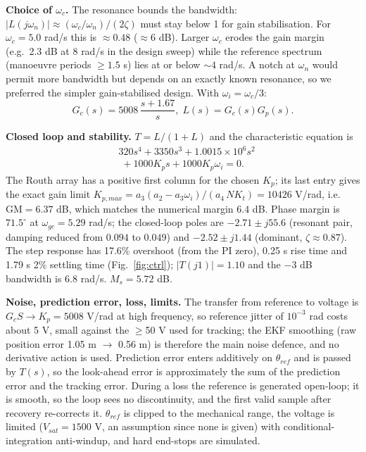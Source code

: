 \documentclass[conference]{IEEEtran}
\newcommand{\dg}{^\circ}
\begin{document}
\textbf{Choice of $\omega_c$.} The resonance bounds the bandwidth: $|L(j\omega_n)|\approx(\omega_c/\omega_n)/(2\zeta)$ must stay below 1 for gain stabilisation. For $\omega_c=5.0$ rad/s this is $\approx0.48$ ($\approx6$ dB). Larger $\omega_c$ erodes the gain margin (e.g.\ 2.3 dB at 8 rad/s in the design sweep) while the reference spectrum (manoeuvre periods $\ge1.5$ s) lies at or below $\sim4$ rad/s. A notch at $\omega_n$ would permit more bandwidth but depends on an exactly known resonance, so we preferred the simpler gain-stabilised design. With $\omega_i=\omega_c/3$:
\begin{equation}
G_c(s)=5008\,\frac{s+1.67}{s},\; L(s)=G_c(s)G_p(s).
\end{equation}

\textbf{Closed loop and stability.} $T=L/(1+L)$ and the characteristic equation is
\begin{equation}
\begin{split}&320s^4+3350s^3+1.0015{\times}10^6s^2\\&\;+1000K_ps+1000K_p\omega_i=0.\end{split}
\end{equation}
The Routh array has a positive first column for the chosen $K_p$; its last entry gives the exact gain limit $K_{p,max}=a_3(a_2-a_3\omega_i)/(a_4\,NK_t)=10426$ V/rad, i.e.\ $\mathrm{GM}=6.37$ dB, which matches the numerical margin $6.4$ dB. Phase margin is $71.5\dg$ at $\omega_{gc}=5.29$ rad/s; the closed-loop poles are $-2.71\pm j55.6$ (resonant pair, damping reduced from $0.094$ to $0.049$) and $-2.52\pm j1.44$ (dominant, $\zeta\approx0.87$). The step response has 17.6\% overshoot (from the PI zero), 0.25 s rise time and 1.79 s 2\% settling time (Fig.~\ref{fig:ctrl}); $|T(j1)|=1.10$ and the $-3$ dB bandwidth is 6.8 rad/s. $M_s=5.72$ dB.

\textbf{Noise, prediction error, loss, limits.} The transfer from reference to voltage is $G_cS\to K_p=5008$ V/rad at high frequency, so reference jitter of $10^{-3}$ rad costs about 5 V, small against the $\ge$50 V used for tracking; the EKF smoothing (raw position error 1.05 m $\to$ 0.56 m) is therefore the main noise defence, and no derivative action is used. Prediction error enters additively on $\theta_{ref}$ and is passed by $T(s)$, so the look-ahead error is approximately the sum of the prediction error and the tracking error. During a loss the reference is generated open-loop; it is smooth, so the loop sees no discontinuity, and the first valid sample after recovery re-corrects it. $\theta_{ref}$ is clipped to the mechanical range, the voltage is limited ($V_{sat}=1500$ V, an assumption since none is given) with conditional-integration anti-windup, and hard end-stops are simulated.
\end{document}
